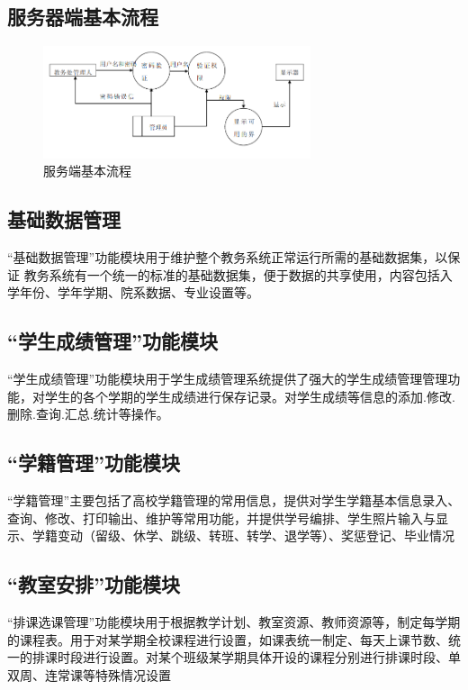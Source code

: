 \subsection{服务器端基本流程}
\begin{figure}[H] %
    \centering %
    \includegraphics[width=0.7\textwidth]{选区_003} %
    \caption{服务端基本流程} %
    \label{Fig.main2} %
\end{figure}

\subsection{基础数据管理}
“基础数据管理”功能模块用于维护整个教务系统正常运行所需的基础数据集，以保证
教务系统有一个统一的标准的基础数据集，便于数据的共享使用，内容包括入学年份、学年学期、院系数据、专业设置等。

\subsection{“学生成绩管理”功能模块}
“学生成绩管理”功能模块用于学生成绩管理系统提供了强大的学生成绩管理管理功能，对学生的各个学期的学生成绩进行保存记录。对学生成绩等信息的添加.修改.删除.查询.汇总.统计等操作。

\subsection{“学籍管理”功能模块}
“学籍管理”主要包括了高校学籍管理的常用信息，提供对学生学籍基本信息录入、查询、修改、打印输出、维护等常用功能，并提供学号编排、学生照片输入与显示、学籍变动（留级、休学、跳级、转班、转学、退学等）、奖惩登记、毕业情况

\subsection{“教室安排”功能模块}
“排课选课管理”功能模块用于根据教学计划、教室资源、教师资源等，制定每学期的课程表。用于对某学期全校课程进行设置，如课表统一制定、每天上课节数、统一的排课时段进行设置。对某个班级某学期具体开设的课程分别进行排课时段、单双周、连常课等特殊情况设置

